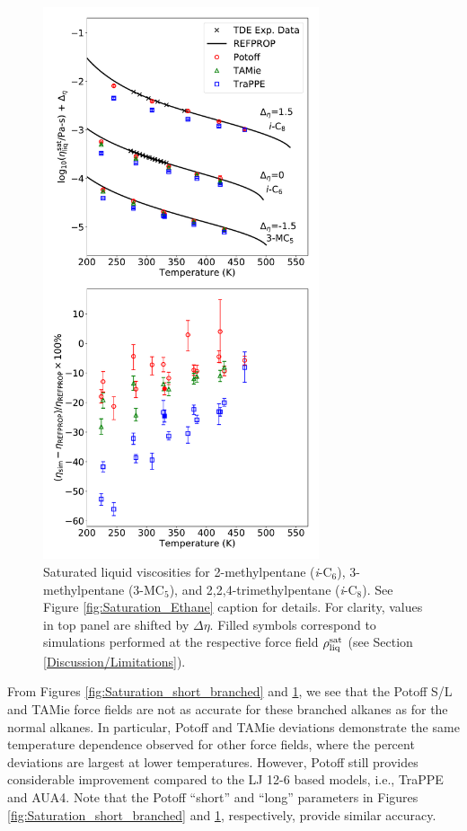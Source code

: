 \documentclass[preprint,review,12pt]{elsarticle}
\begin{document}
	\begin{figure}[htb!]
		\centering
		\includegraphics[width=3.2in]{compare_force_fields_long_branched.pdf}
		\caption{Saturated liquid viscosities for 2-methylpentane (\textit{i}-C$_{6}$), 3-methylpentane (3-MC$_5$), and 2,2,4-trimethylpentane (\textit{i}-C$_{8}$). See Figure \ref{fig:Saturation_Ethane} caption for details. For clarity, values in top panel are shifted by $\Delta \eta$. Filled symbols correspond to simulations performed at the respective force field $\rho_{\rm liq}^{\rm sat}$ (see Section \ref{Discussion/Limitations}).}
		\label{fig:Saturation_long_branched}
	\end{figure} 
	
	From Figures \ref{fig:Saturation_short_branched} and \ref{fig:Saturation_long_branched}, we see that the Potoff S/L and TAMie force fields are not as accurate for these branched alkanes as for the normal alkanes. In particular, Potoff and TAMie deviations demonstrate the same temperature dependence observed for other force fields, where the percent deviations are largest at lower temperatures. However, Potoff still provides considerable improvement compared to the LJ 12-6 based models, i.e., TraPPE and AUA4. Note that the Potoff ``short'' and ``long'' parameters in Figures \ref{fig:Saturation_short_branched} and \ref{fig:Saturation_long_branched}, respectively, provide similar accuracy. 
	
\end{document}
